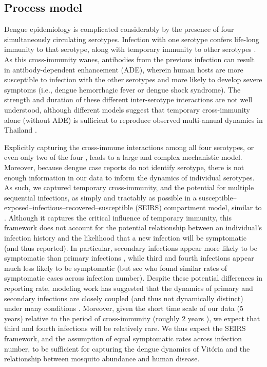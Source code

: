 \documentclass[10pt,letterpaper]{article}
\begin{document}
\subsection*{Process model}

Dengue epidemiology is complicated considerably by the presence of four simultaneously circulating serotypes.
Infection with one serotype confers life-long immunity to that serotype, along with temporary immunity to other serotypes \cite{Wearing2006}.  
As this cross-immunity wanes, antibodies from the previous infection can result in antibody-dependent enhancement (ADE), wherein human hosts are more susceptible to infection with the other serotypes and more likely to develop severe symptoms (i.e., dengue hemorrhagic fever or dengue shock syndrome)\cite{Wearing2006}.
The strength and duration of these different inter-serotype interactions are not well understood, although different models suggest that temporary cross-immunity alone (without ADE) is sufficient to reproduce observed multi-annual dynamics in Thailand \cite{Wearing2006,Reich2013}.

Explicitly capturing the cross-immune interactions among all four serotypes, or even only two of the four \cite{Aguiar2013}, leads to a large and complex mechanistic model.
Moreover, because dengue case reports do not identify serotype, there is not enough information in our data to inform the dynamics of individual serotypes.
As such, we captured temporary cross-immunity, and the potential for multiple sequential infections, as simply and tractably as possible in a susceptible--exposed--infectious--recovered--susceptible (SEIRS) compartment model, similar to \cite{Newton1992, Burattini2008, Pinho2010, Hooten2010}.
Although it captures the critical influence of temporary immunity, this framework does not account for the potential relationship between an individual's infection history and the likelihood that a new infection will be symptomatic (and thus reported).
In particular, secondary infections appear more likely to be symptomatic than primary infections \cite{Imai2016,Clapham2017}, while third and fourth infections appear much less likely to be symptomatic \cite{Olkowski2013} (but see \cite{Montoya2013} who found similar rates of symptomatic cases across infection number).
Despite these potential differences in reporting rate, modeling work has suggested that the dynamics of primary and secondary infections are closely coupled (and thus not dynamically distinct) under many conditions \cite{Schwartz2005}.
Moreover, given the short time scale of our data (5 years) relative to the period of cross-immunity (roughly 2 years \cite{Reich2013}), we expect that third and fourth infections will be relatively rare.
We thus expect the SEIRS framework, and the assumption of equal symptomatic rates across infection number, to be sufficient for capturing the dengue dynamics of Vit\'oria and the relationship between mosquito abundance and human disease.
\end{document}

